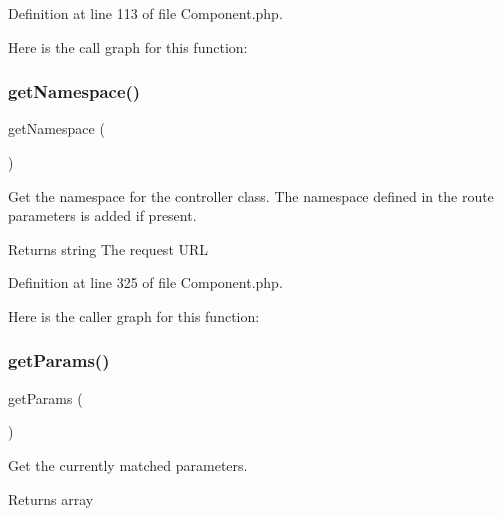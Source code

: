Definition at line 113 of file Component.\+php.

Here is the call graph for this function\+:
\mbox{\label{class_zest_1_1_component_1_1_component_a2614df64646ac71b70b1e1074258052b}} 
\subsubsection{\texorpdfstring{get\+Namespace()}{getNamespace()}}
{\footnotesize\ttfamily get\+Namespace (\begin{DoxyParamCaption}{ }\end{DoxyParamCaption})\hspace{0.3cm}{\ttfamily [protected]}}

Get the namespace for the controller class. The namespace defined in the route parameters is added if present.

\begin{DoxyReturn}{Returns}
string The request U\+RL 
\end{DoxyReturn}


Definition at line 325 of file Component.\+php.

Here is the caller graph for this function\+:
\mbox{\label{class_zest_1_1_component_1_1_component_ae32cd7c32721b02d676bb63b4b1366db}} 
\subsubsection{\texorpdfstring{get\+Params()}{getParams()}}
{\footnotesize\ttfamily get\+Params (\begin{DoxyParamCaption}{ }\end{DoxyParamCaption})}

Get the currently matched parameters.

\begin{DoxyReturn}{Returns}
array 
\end{DoxyReturn}


